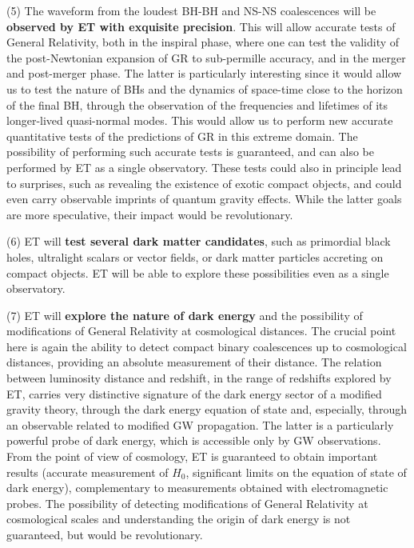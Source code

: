 (5) The waveform from the loudest BH-BH and NS-NS coalescences will be \textbf{observed
by ET with exquisite precision}. This will allow accurate tests of General
Relativity, both in the inspiral phase, where one can test the validity of the
post-Newtonian expansion of GR to sub-permille accuracy, and in the merger and
post-merger phase. The latter is particularly interesting since it would allow
us to test the nature of BHs and the dynamics of space-time close to the horizon
of the final BH, through the observation of  the frequencies and lifetimes of
its longer-lived quasi-normal modes. This would allow us to perform 
new accurate quantitative tests of the predictions of GR in this extreme
domain. The possibility of performing such accurate tests is guaranteed, and can
also  be performed by ET as a single observatory. These tests could also in
principle lead to  surprises, such as revealing  the existence of exotic compact
objects, and could even carry observable imprints of quantum gravity effects.
While the latter goals are more speculative, their impact would be
revolutionary.

(6) ET will \textbf{test several dark matter candidates}, such as primordial black
holes, ultralight scalars or vector fields, or dark matter particles accreting on compact objects.
ET will be able to explore these possibilities even as a single observatory.  

(7) ET will \textbf{explore the nature of dark energy} and the possibility of
modifications of General Relativity at cosmological distances. The crucial point
here is again the ability to detect compact binary coalescences up to
cosmological distances, providing an absolute measurement of their distance. The
relation between luminosity distance and redshift, in the range of redshifts
explored by  ET, carries very distinctive signature of the dark energy sector of
a modified gravity theory, through the dark energy equation of state and,
especially, through  an observable related to modified GW propagation. The
latter is a particularly powerful probe of dark energy, which is accessible only
by GW observations.  From the point of view of cosmology, ET is guaranteed to
obtain  important results (accurate measurement of $H_0$, significant limits on
the equation of state of dark energy), complementary to measurements obtained
with electromagnetic probes. 
The possibility of detecting  modifications of
General Relativity at cosmological scales and understanding the origin of dark
energy is not guaranteed, but would be revolutionary.

